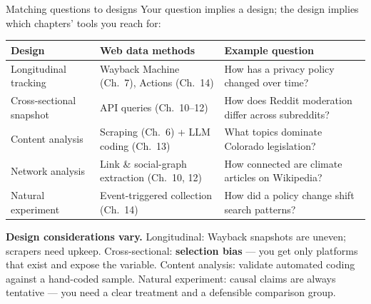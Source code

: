\documentclass[9pt,aspectratio=169]{beamer}
\begin{document}
\begin{frame}{Matching questions to designs}
    Your question implies a design; the design implies which chapters' tools you reach for:
    \begin{center}\small
    \begin{tabular}{@{}p{}p{}p{}@{}}
        \toprule
        \textbf{Design} & \textbf{Web data methods} & \textbf{Example question} \\
        \midrule
        Longitudinal tracking & Wayback Machine (Ch.~7), Actions (Ch.~14) & How has a privacy policy changed over time? \\
        Cross-sectional snapshot & API queries (Ch.~10--12) & How does Reddit moderation differ across subreddits? \\
        Content analysis & Scraping (Ch.~6) + LLM coding (Ch.~13) & What topics dominate Colorado legislation? \\
        Network analysis & Link \& social-graph extraction (Ch.~10, 12) & How connected are climate articles on Wikipedia? \\
        Natural experiment & Event-triggered collection (Ch.~14) & How did a policy change shift search patterns? \\
        \bottomrule
    \end{tabular}
    \end{center}
    \vspace{0.4em}
    {\footnotesize \textbf{Design considerations vary.} Longitudinal: Wayback snapshots are uneven; scrapers need upkeep. Cross-sectional: \textbf{selection bias} --- you get only platforms that exist and expose the variable. Content analysis: validate automated coding against a hand-coded sample. Natural experiment: causal claims are always tentative --- you need a clear treatment and a defensible comparison group.}
\end{frame}
\end{document}
